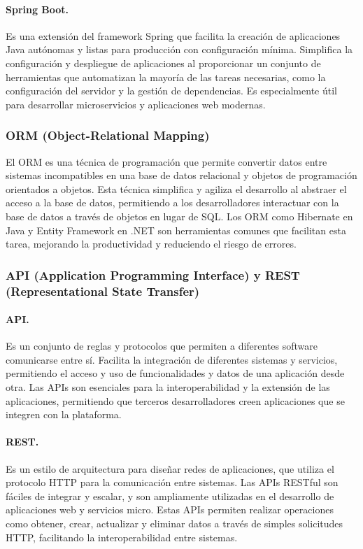 \paragraph{Spring Boot.}
Es una extensión del framework Spring que facilita la creación de aplicaciones Java autónomas y listas para producción con configuración mínima. Simplifica la configuración y despliegue de aplicaciones al proporcionar un conjunto de herramientas que automatizan la mayoría de las tareas necesarias, como la configuración del servidor y la gestión de dependencias. Es especialmente útil para desarrollar microservicios y aplicaciones web modernas.

\subsubsection{ORM (Object-Relational Mapping)}
El ORM es una técnica de programación que permite convertir datos entre sistemas incompatibles en una base de datos relacional y objetos de programación orientados a objetos. Esta técnica simplifica y agiliza el desarrollo al abstraer el acceso a la base de datos, permitiendo a los desarrolladores interactuar con la base de datos a través de objetos en lugar de SQL. Los ORM como Hibernate en Java y Entity Framework en .NET son herramientas comunes que facilitan esta tarea, mejorando la productividad y reduciendo el riesgo de errores.

\subsubsection{API (Application Programming Interface) y REST (Representational State Transfer)}
\paragraph{API.}
Es un conjunto de reglas y protocolos que permiten a diferentes software comunicarse entre sí. Facilita la integración de diferentes sistemas y servicios, permitiendo el acceso y uso de funcionalidades y datos de una aplicación desde otra. Las APIs son esenciales para la interoperabilidad y la extensión de las aplicaciones, permitiendo que terceros desarrolladores creen aplicaciones que se integren con la plataforma.

\paragraph{REST.}
Es un estilo de arquitectura para diseñar redes de aplicaciones, que utiliza el protocolo HTTP para la comunicación entre sistemas. Las APIs RESTful son fáciles de integrar y escalar, y son ampliamente utilizadas en el desarrollo de aplicaciones web y servicios micro. Estas APIs permiten realizar operaciones como obtener, crear, actualizar y eliminar datos a través de simples solicitudes HTTP, facilitando la interoperabilidad entre sistemas.

